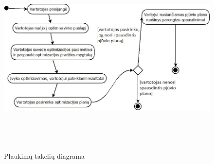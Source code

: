 \documentclass[a4paper,12pt]{article}
\begin{document}
\begin{figure}[ht]
\caption{Plaukimų takelių diagrama}
\includegraphics[width=18cm, height=10cm]{swim}
\centering
\end{figure}
\end{document}
